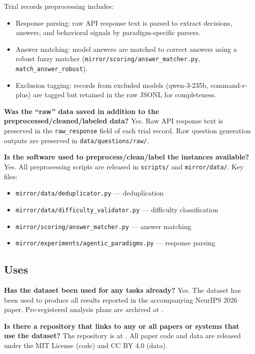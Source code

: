 Trial records preprocessing includes:
\begin{itemize}
  \item Response parsing: raw API response text is parsed to extract decisions,
    answers, and behavioral signals by paradigm-specific parsers.
  \item Answer matching: model answers are matched to correct answers using a robust
    fuzzy matcher (\texttt{mirror/scoring/answer\_matcher.py},
    \texttt{match\_answer\_robust}).
  \item Exclusion tagging: records from excluded models (qwen-3-235b, command-r-plus)
    are tagged but retained in the raw JSONL for completeness.
\end{itemize}

\textbf{Was the ``raw'' data saved in addition to the preprocessed/cleaned/labeled data?}
Yes. Raw API response text is preserved in the \texttt{raw\_response} field of each
trial record. Raw question generation outputs are preserved in
\texttt{data/questions/raw/}.

\textbf{Is the software used to preprocess/clean/label the instances available?}
Yes. All preprocessing scripts are released in \texttt{scripts/} and
\texttt{mirror/data/}. Key files:
\begin{itemize}
  \item \texttt{mirror/data/deduplicator.py} — deduplication
  \item \texttt{mirror/data/difficulty\_validator.py} — difficulty classification
  \item \texttt{mirror/scoring/answer\_matcher.py} — answer matching
  \item \texttt{mirror/experiments/agentic\_paradigms.py} — response parsing
\end{itemize}

\subsection*{Uses}

\textbf{Has the dataset been used for any tasks already?}
Yes. The dataset has been used to produce all results reported in the accompanying
NeurIPS 2026 paper. Pre-registered analysis plans are archived at .

\textbf{Is there a repository that links to any or all papers or systems that use the dataset?}
The repository is at . All paper code and data are released under
the MIT License (code) and CC BY 4.0 (data).

